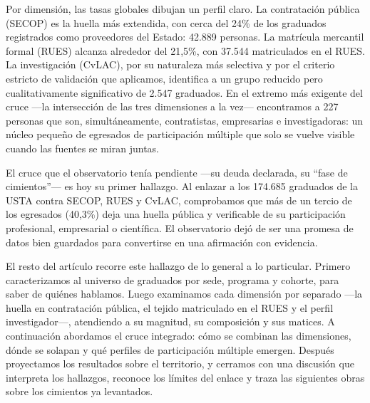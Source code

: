 Por dimensión, las tasas globales dibujan un perfil claro. La contratación pública (SECOP) es la huella más extendida, con cerca del 24\% de los graduados registrados como proveedores del Estado: 42.889 personas. La matrícula mercantil formal (RUES) alcanza alrededor del 21,5\%, con 37.544 matriculados en el RUES. La investigación (CvLAC), por su naturaleza más selectiva y por el criterio estricto de validación que aplicamos, identifica a un grupo reducido pero cualitativamente significativo de 2.547 graduados. En el extremo más exigente del cruce —la intersección de las tres dimensiones a la vez— encontramos a 227 personas que son, simultáneamente, contratistas, empresarias e investigadoras: un núcleo pequeño de egresados de participación múltiple que solo se vuelve visible cuando las fuentes se miran juntas.

\begin{cajahallazgo}
El cruce que el observatorio tenía pendiente —su deuda declarada, su \enquote{fase de cimientos}— es hoy su primer hallazgo. Al enlazar a los 174.685 graduados de la USTA contra SECOP, RUES y CvLAC, comprobamos que más de un tercio de los egresados (40,3\%) deja una huella pública y verificable de su participación profesional, empresarial o científica. El observatorio dejó de ser una promesa de datos bien guardados para convertirse en una afirmación con evidencia.
\end{cajahallazgo}

El resto del artículo recorre este hallazgo de lo general a lo particular. Primero caracterizamos al universo de graduados por sede, programa y cohorte, para saber de quiénes hablamos. Luego examinamos cada dimensión por separado —la huella en contratación pública, el tejido matriculado en el RUES y el perfil investigador—, atendiendo a su magnitud, su composición y sus matices. A continuación abordamos el cruce integrado: cómo se combinan las dimensiones, dónde se solapan y qué perfiles de participación múltiple emergen. Después proyectamos los resultados sobre el territorio, y cerramos con una discusión que interpreta los hallazgos, reconoce los límites del enlace y traza las siguientes obras sobre los cimientos ya levantados.
